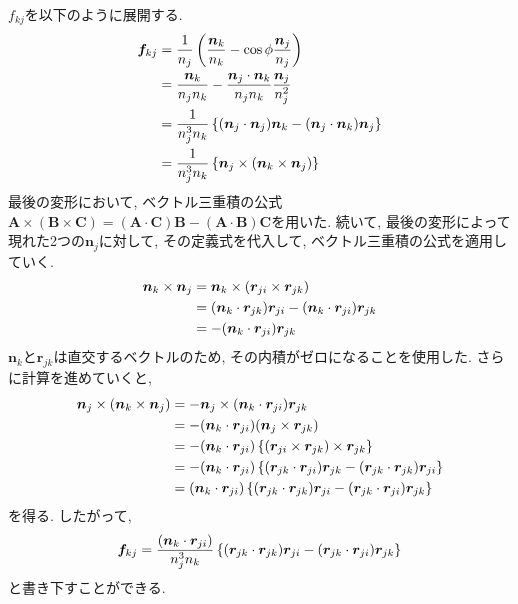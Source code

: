 $f_{kj}$を以下のように展開する. 
\begin{align}
    \bm{f}_{kj}
 &=
    \frac{1}{n_j}
    \left(
           \frac{\bm{n}_{k}}{n_{k}} - \cos\phi \frac{\bm{n}_{j}}{n_{j}}
    \right)
 \notag
 \\
 &=
    \frac{\bm{n}_{k}}{n_{j}n_{k}}
   -\frac{\bm{n}_{j} \cdot \bm{n}_{k}}{n_{j}n_{k}}
    \frac{\bm{n}_{j}}{n_{j}^{2}}
 \notag
 \\
 &=
    \frac{1}{n_{j}^{3}n_{k}}
    \left\{
            (\bm{n}_{j} \cdot \bm{n}_{j}) \bm{n}_{k}
           -(\bm{n}_{j} \cdot \bm{n}_{k}) \bm{n}_{j}
    \right\}
 \notag
 \\
 &=
    \frac{1}{n_{j}^{3}n_{k}}
    \left\{
            \bm{n}_{j} \times (\bm{n}_{k} \times \bm{n}_{j})
    \right\}
 \notag
\end{align}
最後の変形において, ベクトル三重積の公式
$\bm{A} \times (\bm{B} \times \bm{C}) = (\bm{A} \cdot \bm{C})\bm{B}
 - (\bm{A} \cdot \bm{B})\bm{C}$を用いた.
続いて, 最後の変形によって現れた2つの$\bm{n}_{j}$に対して, 
その定義式を代入して, ベクトル三重積の公式を適用していく. 
\begin{align}
    \bm{n}_{k} \times \bm{n}_{j}
 &=
    \bm{n}_{k} \times (\bm{r}_{ji} \times \bm{r}_{jk})
 \notag
 \\
 &=
    (\bm{n}_{k} \cdot \bm{r}_{jk}) \bm{r}_{ji}
   -(\bm{n}_{k} \cdot \bm{r}_{ji}) \bm{r}_{jk}
 \notag
 \\
 &=
   -(\bm{n}_{k} \cdot \bm{r}_{ji}) \bm{r}_{jk}
 \notag
\end{align}
$\bm{n}_{k}$と$\bm{r}_{jk}$は直交するベクトルのため, その内積がゼロになることを使用した. 
さらに計算を進めていくと, 
\begin{align}
    \bm{n}_{j} \times (\bm{n}_{k} \times \bm{n}_{j})
 &=
   -\bm{n}_{j} \times (\bm{n}_{k} \cdot \bm{r}_{ji}) \bm{r}_{jk}
 \notag
 \\
 &=
   -(\bm{n}_{k} \cdot \bm{r}_{ji})
    (\bm{n}_{j} \times \bm{r}_{jk})
 \notag
 \\
 &=
   -(\bm{n}_{k} \cdot \bm{r}_{ji})
   \left\{
          (\bm{r}_{ji} \times \bm{r}_{jk}) \times \bm{r}_{jk}
   \right\}
 \notag
 \\
 &=
   -(\bm{n}_{k} \cdot \bm{r}_{ji})
   \left\{
           (\bm{r}_{jk} \cdot \bm{r}_{ji}) \bm{r}_{jk}
          -(\bm{r}_{jk} \cdot \bm{r}_{jk}) \bm{r}_{ji}
   \right\}
 \notag
 \\
 &=
   (\bm{n}_{k} \cdot \bm{r}_{ji})
   \left\{
           (\bm{r}_{jk} \cdot \bm{r}_{jk}) \bm{r}_{ji}
          -(\bm{r}_{jk} \cdot \bm{r}_{ji}) \bm{r}_{jk}
   \right\}
   \notag
\end{align}
を得る. したがって, 
\begin{align}
  \bm{f}_{kj}
 =
  \frac{(\bm{n}_{k} \cdot \bm{r}_{ji})}{n_{j}^{3}n_{k}}
  \left\{
          (\bm{r}_{jk} \cdot \bm{r}_{jk}) \bm{r}_{ji}
         -(\bm{r}_{jk} \cdot \bm{r}_{ji}) \bm{r}_{jk}
  \right\}
  \notag
\end{align}
と書き下すことができる. 
\\

